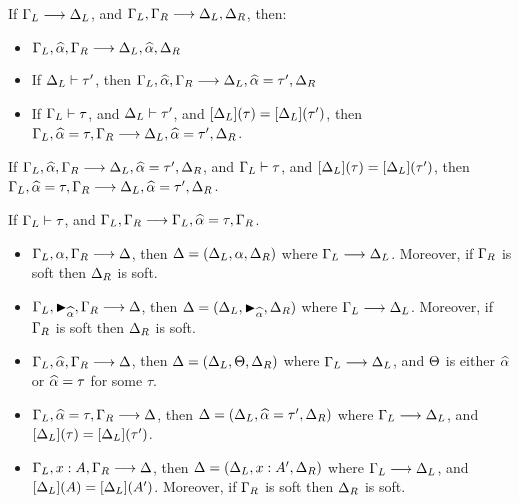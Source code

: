 \begin{lemma}
  \label{lemma:dunfield:ParallelAdmissibility}
  If $\Gamma_L \longrightarrow \Delta_L$,
  and $\Gamma_L, \Gamma_R \longrightarrow \Delta_L, \Delta_R$, then:
  \begin{itemize}
    \item $\Gamma_L, \widehat{\alpha}, \Gamma_R  \longrightarrow \Delta_L, \widehat{\alpha}, \Delta_R$
    \item If $\Delta_L \vdash \tau'$,
      then $\Gamma_L, \widehat{\alpha}, \Gamma_R \longrightarrow \Delta_L, \widehat{\alpha} = \tau', \Delta_R $
    \item  If $\Gamma_L \vdash \tau$,
      and $\Delta_L \vdash \tau'$,
      and $[\Delta_L](\tau) = [\Delta_L](\tau') $,
      then $\Gamma_L, \widehat{\alpha} = \tau, \Gamma_R \longrightarrow \Delta_L, \widehat{\alpha} = \tau', \Delta_R$.
  \end{itemize}
\end{lemma}

\begin{lemma}
  \label{lemma:dunfield:ParallelExtensionSolution}
  If $\Gamma_L, \widehat{\alpha}, \Gamma_R \longrightarrow \Delta_L, \widehat{\alpha} = \tau', \Delta_R $,
  and $\Gamma_L \vdash \tau  $,
  and  $[\Delta_L](\tau) = [\Delta_L](\tau') $,
  then $\Gamma_L, \widehat{\alpha} = \tau, \Gamma_R \longrightarrow \Delta_L, \widehat{\alpha} = \tau', \Delta_R $.
\end{lemma}

\begin{lemma}
  \label{lemma:dunfield:SolvedVariableAdditionForExtension}
  If $\Gamma_L \vdash \tau$,
  and $\Gamma_L, \Gamma_R \longrightarrow \Gamma_L, \widehat{\alpha} = \tau, \Gamma_R $.
\end{lemma}

\begin{lemma}\leavevmode
  \label{lemma:dunfield:ExtensionOrder}
  \begin{itemize}
  \item $\Gamma_L, \alpha, \Gamma_R \longrightarrow \Delta$,
    then $\Delta = (\Delta_L, \alpha, \Delta_R)$
    where $\Gamma_L \longrightarrow \Delta_L$.
    Moreover, if $\Gamma_R$ is soft then $\Delta_R$ is soft.
  \item $\Gamma_L, \blacktriangleright_{\widehat{\alpha}}, \Gamma_R \longrightarrow \Delta$,
    then $\Delta = (\Delta_L, \blacktriangleright_{\widehat{\alpha}}, \Delta_R)$
    where $\Gamma_L \longrightarrow \Delta_L$.
    Moreover, if $\Gamma_R$ is soft then $\Delta_R$ is soft.
  \item $\Gamma_L, \widehat{\alpha}, \Gamma_R \longrightarrow \Delta$,
    then $\Delta = (\Delta_L, \Theta, \Delta_R)$
    where $\Gamma_L \longrightarrow \Delta_L$,
    and $\Theta$ is either $\widehat{\alpha}$ or $\widehat{\alpha} = \tau$ for some $\tau$.
  \item $\Gamma_L, \widehat{\alpha} = \tau, \Gamma_R \longrightarrow \Delta$,
    then $\Delta = (\Delta_L, \widehat{\alpha} = \tau', \Delta_R)$
    where $\Gamma_L \longrightarrow \Delta_L$,
    and $[\Delta_L](\tau) = [\Delta_L](\tau')$.
  \item $\Gamma_L, x : A, \Gamma_R \longrightarrow \Delta$,
    then $\Delta = (\Delta_L, x : A', \Delta_R)$
    where $\Gamma_L \longrightarrow \Delta_L$,
    and $[\Delta_L](A) = [\Delta_L](A')$.
    Moreover, if $\Gamma_R$ is soft then $\Delta_R$ is soft.
  \end{itemize}
\end{lemma}

